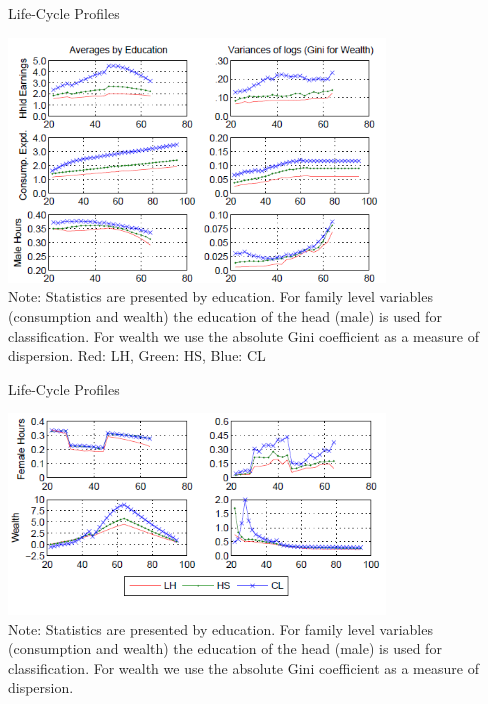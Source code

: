 \documentclass{beamer}
\begin{document}
\begin{frame}[label=Life1]{Life-Cycle Profiles}
\hyperlink{Return7}{}

\begin{center}
\includegraphics[width=100mm]{Figure1_1.png}\\
\tiny{Note: Statistics are presented by education. For family level variables (consumption and wealth) the education of the head (male) is used for classification. For wealth we use the absolute Gini coefficient as a measure of dispersion. Red: LH, Green: HS, Blue: CL}
\end{center}
\end{frame}


\begin{frame}[label=Life2]{Life-Cycle Profiles}
\hyperlink{Return7}{}

\begin{center}
\includegraphics[width=100mm]{Figure1.png}\\
\tiny{Note: Statistics are presented by education. For family level variables (consumption and wealth) the education of the head (male) is used for classification. For wealth we use the absolute Gini coefficient as a measure of dispersion. }
\end{center}
\end{frame}
\end{document}

